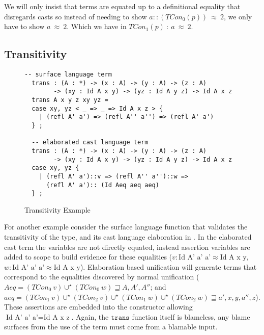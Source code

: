 We will only insist that terms are equated up to a definitional equality that disregards casts so instead of needing to show $a :: (TCon_0(p))\ \approx\ 2$, we only have to show $a\ \approx\ 2$.
Which we have in $TCon_1(p)\ :\ a\ \approx\ 2$.
 

\subsection{Transitivity}

\begin{figure}
  \begin{lstlisting}[basicstyle=\ttfamily\small]
  -- surface language term
  trans : (A : *) -> (x : A) -> (y : A) -> (z : A)
        -> (xy : Id A x y) -> (yz : Id A y z) -> Id A x z
  trans A x y z xy yz =
  case xy, yz < _ => _ => Id A x z > {
    | (refl A' a') => (refl A'' a'') => (refl A' a')
  } ;
  
  -- elaborated cast language term
  trans : (A : *) -> (x : A) -> (y : A) -> (z : A)
        -> (xy : Id A x y) -> (yz : Id A y z) -> Id A x z
  case xy, yz {
    | (refl A' a')::v => (refl A'' a'')::w => 
      (refl A' a'):: (Id Aeq aeq aeq)
  } ;
\end{lstlisting}

\caption{Transitivity Example}
\label{fig:cast-trans}
\end{figure}


For another example consider the surface language function that validates the transitivity of the \Id{} type, and its cast language elaboration in .
In the elaborated cast term the variables are not directly equated, instead assertion variables are added to scope to build evidence for these equalities ($v:\text{Id A' a' a'}\approx\text{Id A x y}$, $w:\text{Id A' a' a'}\approx\text{Id A x y}$).
Elaboration based unification will generate terms that correspond to the equalities discovered by normal unification 
  ($Aeq=\left(TCon_{0}\ v\right)\cup^{\star}\left(TCon_{0}\ w\right)\sqsupseteq A,A',A''$;
  and $aeq=\left(TCon_{1}\ v\right)\cup^{\star}\left(TCon_{2}\ v\right)\cup^{\star}\left(TCon_{1}\ w\right)\cup^{\star}\left(TCon_{2}\ w\right)\sqsupseteq a',x,y,a'',z$).
These assertions are embedded into the constructor allowing $\text{Id A' a' a'}=\text{Id A x z}$.
Again, the $\mathtt{trans}$ function itself is blameless, any blame surfaces from the use of the term must come from a blamable input.


